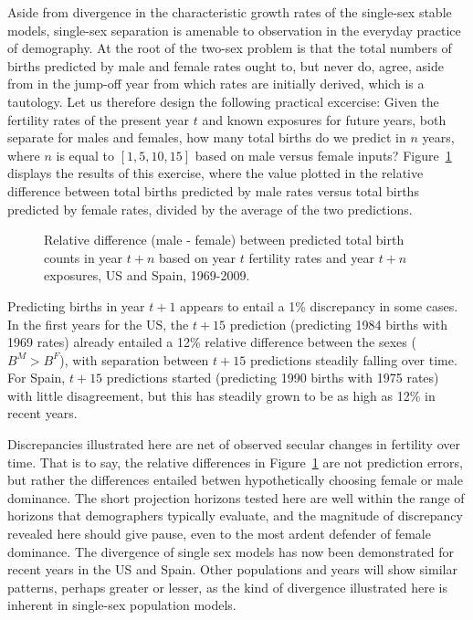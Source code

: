  \FloatBarrier
\label{sec:divbirth}
Aside from divergence in the characteristic growth rates of the single-sex
stable models, single-sex separation is amenable to observation in the everyday
practice of demography. At the root of the two-sex problem is that the total
numbers of births predicted by male and female rates ought to, but never do,
agree, aside from in the jump-off year from which rates are initially derived, 
which is a tautology. Let us therefore design the following practical excercise:
Given the fertility rates of the present year $t$ and known exposures for
future years, both separate for males and females, how many total births do we
predict in $n$ years, where $n$ is equal to $[1, 5, 10, 15]$ based on male
versus female inputs? Figure~\ref{fig:BirthCountDivergenceAge} displays the
results of this exercise, where the value plotted in the relative difference
between total births predicted by male rates versus total births predicted by
female rates, divided by the average of the two predictions.

\begin{figure}[ht!]
        \centering  
          \caption{Relative difference (male - female) between predicted total
          birth counts in year $t+n$ based on year $t$ fertility rates and year $t+n$ exposures, US and Spain, 1969-2009.}
          \label{fig:BirthCountDivergenceAge}
\end{figure}

Predicting births in year $t+1$ appears to entail a 1\% discrepancy in some
cases. In the first years for the US, the $t+15$ prediction (predicting
1984 births with 1969 rates) already entailed a 12\% relative difference
between the sexes ($B^M > B^F$), with separation between $t+15$ predictions
steadily falling over time. For Spain, $t+15$ predictions started (predicting 1990
births with 1975 rates) with little disagreement, but this has steadily grown to be as high
as 12\% in recent years.

Discrepancies illustrated here are net of observed secular changes in
fertility over time. That is to say, the relative differences in
Figure~\ref{fig:BirthCountDivergenceAge} are not prediction errors, but rather
the differences entailed betwen hypothetically choosing female or male
dominance. The short projection horizons tested here are well within the range
of horizons that demographers typically evaluate, and the magnitude of
discrepancy revealed here should give pause, even to the most ardent defender
of female dominance. The divergence of single sex
models has now been demonstrated for recent years in the US and Spain. Other
populations and years will show similar patterns, perhaps greater or lesser, as
the kind of divergence illustrated here is inherent in single-sex
population models.

